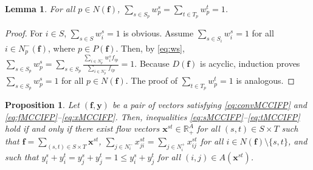 \documentclass[pdflatex,sn-mathphys-num]{sn-jnl}%
\theoremstyle{thmstyleone}%
\newtheorem{lemma}[theorem]{Lemma}%
\newtheorem{proposition}[theorem]{Proposition}%
\begin{document}
\begin{lemma} \label{lem:w}
For all $p\in N(\boldsymbol{f})$, $\sum_{s\in S_p}w_p^s=\sum_{t\in T_p}w_p^t=1$.
\end{lemma}
\begin{proof}
For $i\in S$, $\sum_{s\in S}w_i^s=1$ is obvious. 
Assume $\sum_{s\in S_i}w_i^s=1$ for all $i\in N_p^-(\boldsymbol{f})$, where $p\in P(\boldsymbol{f})$.
Then, by \eqref{eq:ws}, $\sum_{s\in S_p}w_p^s=\sum_{s\in S_p}\frac{\sum_{i\in N_p^-}w_i^sf_{ip}}{\sum_{i\in N_p^-}f_{ip}}=1$.
Because $D(\boldsymbol{f})$ is acyclic, induction proves $\sum_{s\in S_p}w_p^s=1$ for all $p\in N(\boldsymbol{f})$.
The proof of $\sum_{t\in T_p}w_p^t=1$ is analogous.
\end{proof}

\begin{proposition} \label{prop:multi}
Let $(\boldsymbol{f},\boldsymbol{y})$ be a pair of vectors satisfying \eqref{eq:convMCCIFP} and \eqref{eq:fMCCIFP}--\eqref{eq:xMCCIFP}.
Then, inequalities \eqref{eq:sMCCIFP}--\eqref{eq:tMCCIFP} hold if and only if there exist flow vectors
$\boldsymbol{x}^{st}\in\mathbb{R}_+^A$ for all $(s,t)\in S\times T$ such that $\boldsymbol{f} = \sum_{(s,t)\in S\times T}\boldsymbol{x}^{st}$,
$\sum_{j\in N_i^-}x_{ji}^{st} = \sum_{j\in N_i^+}x_{ij}^{st}$ for all $i\in N(\boldsymbol{f})\setminus\{s,t\}$, and such that
$y_i^s+y_i^t=y_j^s+y_j^t=1\leq y_i^s+y_j^t$ for all $(i,j)\in A(\boldsymbol{x}^{st})$.
\end{proposition}
\end{document}
